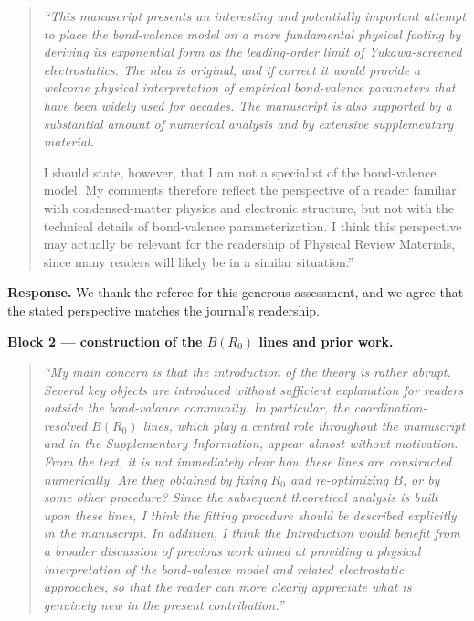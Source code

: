 \documentclass[11pt]{article}
\newenvironment{refquote}%
  {\begin{quote}\itshape\color{black!70}}%
  {\end{quote}}
\begin{document}
\begin{refquote}
``This manuscript presents an interesting and potentially important
attempt to place the bond-valence model on a more fundamental physical
footing by deriving its exponential form as the leading-order limit of
Yukawa-screened electrostatics.  The idea is original, and if correct
it would provide a welcome physical interpretation of empirical
bond-valence parameters that have been widely used for decades.  The
manuscript is also supported by a substantial amount of numerical
analysis and by extensive supplementary material.

I should state, however, that I am not a specialist of the bond-valence
model.  My comments therefore reflect the perspective of a reader
familiar with condensed-matter physics and electronic structure, but
not with the technical details of bond-valence parameterization.  I
think this perspective may actually be relevant for the readership of
Physical Review Materials, since many readers will likely be in a
similar situation.''
\end{refquote}

\textbf{Response.}  We thank the referee for this generous assessment,
and we agree that the stated perspective matches the journal's
readership.

\textbf{Block 2 --- construction of the $B(R_0)$ lines and prior work.}

\begin{refquote}
``My main concern is that the introduction of the theory is rather
abrupt.  Several key objects are introduced without sufficient
explanation for readers outside the bond-valance community.  In
particular, the coordination-resolved $B(R_0)$ lines, which play a
central role throughout the manuscript and in the Supplementary
Information, appear almost without motivation.  From the text, it is
not immediately clear how these lines are constructed numerically.
Are they obtained by fixing $R_0$ and re-optimizing $B$, or by some
other procedure?  Since the subsequent theoretical analysis is built
upon these lines, I think the fitting procedure should be described
explicitly in the manuscript.  In addition, I think the Introduction
would benefit from a broader discussion of previous work aimed at
providing a physical interpretation of the bond-valence model and
related electrostatic approaches, so that the reader can more clearly
appreciate what is genuinely new in the present contribution.''
\end{refquote}
\end{document}
